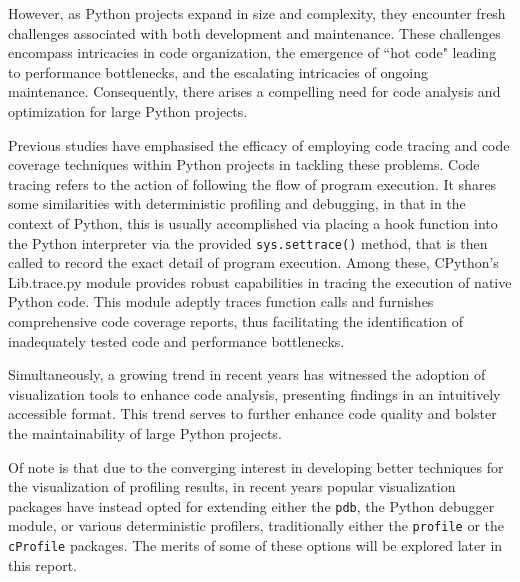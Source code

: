 \documentclass[conference]{IEEEtran}
\begin{document}
However, as Python projects expand in size and complexity, they encounter fresh challenges associated with both development and maintenance. These challenges encompass intricacies in code organization, the emergence of ``hot code" leading to performance bottlenecks, and the escalating intricacies of ongoing maintenance\cite{peng2021empirical}. Consequently, there arises a compelling need for code analysis and optimization for large Python projects\cite{ray2014large}.

Previous studies have emphasised the efficacy of employing code tracing and code coverage techniques within Python projects in tackling these problems. Code tracing refers to the action of following the flow of program execution. It shares some similarities with deterministic profiling and debugging, in that in the context of Python, this is usually accomplished via placing a hook function into the Python interpreter via the provided \texttt{sys.settrace()} method, that is then called to record the exact detail of program execution. Among these, CPython's Lib.trace.py module provides robust capabilities in tracing the execution of native Python code\cite{aakerblom2014tracing}. This module adeptly traces function calls and furnishes comprehensive code coverage reports, thus facilitating the identification of inadequately tested code and performance bottlenecks. \par
 
Simultaneously, a growing trend in recent years has witnessed the adoption of visualization tools to enhance code analysis, presenting findings in an intuitively accessible format\cite{cao2021research,fernandez2023empirical}. This trend serves to further enhance code quality and bolster the maintainability of large Python projects.\par

Of note is that due to the converging interest in developing better techniques for the visualization of profiling results, in recent years popular visualization packages have instead opted for extending either the \texttt{pdb}, the Python debugger module, or various deterministic profilers, traditionally either the \texttt{profile} or the \texttt{cProfile} packages. The merits of some of these options will be explored later in this report.\par
\end{document}
